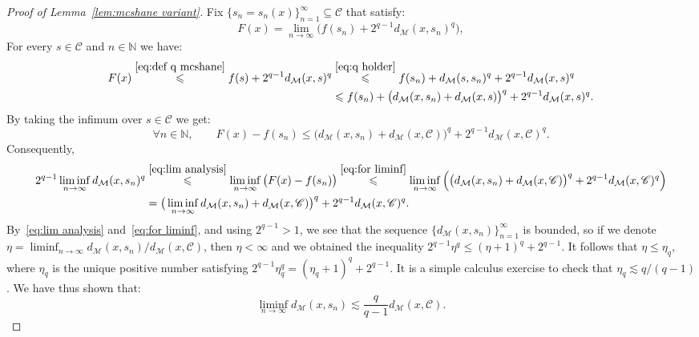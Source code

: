 \documentclass[11pt,reqno]{amsart}
\newcommand{\N}{\mathbb{N}}
\renewcommand{\le}{\leqslant}
\renewcommand{\subset}{\subseteq}
\newcommand{\MM}{\mathcal{M}}
\newcommand{\sub}{\mathscr{C}}
\begin{document}
\begin{proof}[Proof of Lemma~\ref{lem:mcshane variant}]
Fix  $\{s_n=s_n(x)\}_{n=1}^\infty \subset \sub$ that satisfy:
\begin{equation}\label{eq:lim analysis}
F(x)=\lim_{n\to \infty} \big(f(s_n)+2^{q-1}d_\MM(x,s_n)^q\big),
\end{equation}
For every $s\in \sub$ and $n\in \N$ we have:
\begin{align*}
F(x)\stackrel{\eqref{eq:def q mcshane} }{\le} f(s)+2^{q-1}d_\MM(x,s)^q&\stackrel{\eqref{eq:q holder}}{\le} f(s_n)+d_\MM(s,s_n)^q+2^{q-1}d_\MM(x,s)^q\\&\le f(s_n)+ \big(d_\MM(x,s_n)+d_\MM(x,s)\big)^q+2^{q-1}d_\MM(x,s)^q. 
\end{align*}
By taking the infimum over $s\in \sub$ we get:
\begin{equation}\label{eq:for liminf}
\forall n\in \N,\qquad F(x)-f(s_n)\le \big(d_\MM(x,s_n)+d_\MM(x,\sub)\big)^q+2^{q-1}d_\MM(x,\sub)^q.
\end{equation}
Consequently,
\begin{align*}
2^{q-1}\liminf_{n\to\infty}  d_\MM(x,s_n)^q&\stackrel{\eqref{eq:lim analysis}}{\le} \liminf_{n\to\infty} \big(F(x)-f(s_n)\big)\stackrel{\eqref{eq:for liminf}}{\le} \liminf_{n\to\infty} \Big( \big(d_\MM(x,s_n)+d_\MM(x,\sub)\big)^q+2^{q-1}d_\MM(x,\sub)^q\Big)\\&=\big(\liminf_{n\to\infty} d_\MM(x,s_n)+d_\MM(x,\sub)\big)^q+2^{q-1}d_\MM(x,\sub)^q.
\end{align*}
By~\eqref{eq:lim analysis} and~\eqref{eq:for liminf}, and using $2^{q-1}>1$, we see  that the sequence  $\{d_\MM(x,s_n)\}_{n=1}^\infty$ is bounded, so if we denote $\eta=\liminf_{n\to\infty} d_\MM(x,s_n)/d_\MM(x,\sub)$, then $\eta<\infty$ and we obtained the  inequality  $2^{q-1}\eta^q\le (\eta+1)^q+2^{q-1}$. It follows that $\eta\le \eta_q$, where $\eta_q$ is the unique positive number satisfying $2^{q-1}\eta_q^q= (\eta_q+1)^q+2^{q-1}$. It is a simple calculus exercise to check that $\eta_q\lesssim q/(q-1)$. We have thus shown that:
\begin{equation}\label{coercivce bound}
\liminf_{n\to\infty} d_\MM(x,s_n)\lesssim \frac{q}{q-1}d_\MM(x,\sub). 
\end{equation}



\end{proof}
\end{document}
